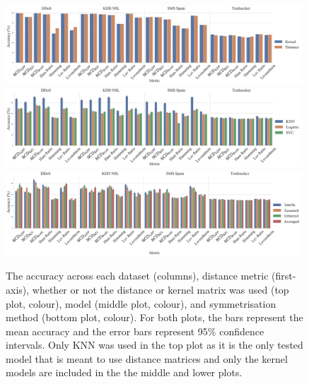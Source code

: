 \documentclass[preprint,12pt]{article}
\begin{document}
\begin{figure}[!htb]
    \centering
    \includegraphics[width=0.99\textwidth]{images/accuracy_vs_kernel.pdf}
    \hfill
    \includegraphics[width=0.99\textwidth]{images/accuracy_vs_metric.pdf}
    \hfill
    \includegraphics[width=0.99\textwidth]{images/accuracy_vs_symmetry.pdf}
    \caption{
    The accuracy across each dataset (columns), distance metric (first-axis), whether or not the distance or kernel matrix was used (top plot, colour), model (middle plot, colour), and symmetrisation method (bottom plot, colour). 
    For both plots, the bars represent the mean accuracy and the error bars represent 95\% confidence intervals.
    Only KNN was used in the top plot as it is the only tested model that is meant to use distance matrices and only the kernel models are included in the the middle and lower plots.
    }
    \label{fig:acc}
\end{figure}
\end{document}
